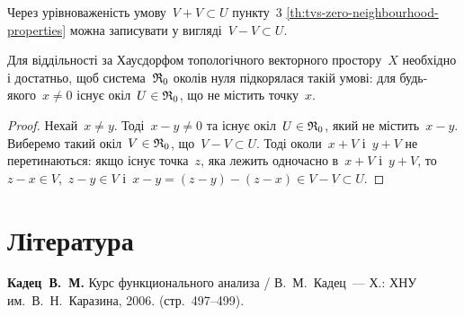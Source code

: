 \begin{remark}
    Через урівноваженість умову~$V + V \subset U$ пункту~3 \cref{th:tvs-zero-neighbourhood-properties} можна записувати у вигляді~$V - V \subset U$.
\end{remark}

\begin{theorem}
    Для віддільності за Хаусдорфом топологічного векторного простору~$X$ необхідно і достатньо, щоб система~$\frak R_0$ околів нуля підкорялася такій умові: для будь-якого~$x \ne 0$ існує окіл~$U \in \frak R_0$, що не містить точку~$x$.
\end{theorem}

\begin{proof}
    Нехай~$x \ne y$. Тоді~$x - y \ne 0$ та існує окіл~$U \in \frak R_0$, який не містить~$x - y$. Виберемо такий окіл~$V \in \frak R_0$, що~$V - V \subset U$. Тоді околи~$x + V$ і~$y + V$ не перетинаються: якщо існує точка~$z$, яка лежить одночасно в~$x + V$ і~$y + V$, то~$z - x \in V$,~$z - y \in V$ і~$x - y =(z - y) -(z - x) \in V - V \subset U$.
\end{proof}

\section{Література}

\begin{enumerate}[label={[\arabic*]}]
\item \textbf{Кадец~В.~М.}
Курс функционального анализа /
В.~М.~Кадец~---
Х.: ХНУ им.~В.~Н.~Каразина, 2006. (стр.~497--499).
\end{enumerate}
